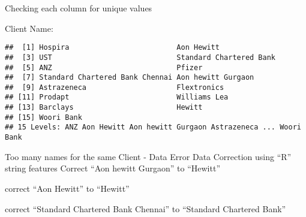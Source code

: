 \documentclass[]{article}
\newenvironment{Shaded}{\begin{snugshade}}{\end{snugshade}}
\newcommand{\KeywordTok}[1]{\textcolor[rgb]{0.13,0.29,0.53}{\textbf{#1}}}
\newcommand{\StringTok}[1]{\textcolor[rgb]{0.31,0.60,0.02}{#1}}
\newcommand{\OperatorTok}[1]{\textcolor[rgb]{0.81,0.36,0.00}{\textbf{#1}}}
\newcommand{\NormalTok}[1]{#1}
\begin{document}
Checking each column for unique values

Client Name:

\begin{Shaded}
\end{Shaded}

\begin{verbatim}
##  [1] Hospira                         Aon Hewitt                     
##  [3] UST                             Standard Chartered Bank        
##  [5] ANZ                             Pfizer                         
##  [7] Standard Chartered Bank Chennai Aon hewitt Gurgaon             
##  [9] Astrazeneca                     Flextronics                    
## [11] Prodapt                         Williams Lea                   
## [13] Barclays                        Hewitt                         
## [15] Woori Bank                     
## 15 Levels: ANZ Aon Hewitt Aon hewitt Gurgaon Astrazeneca ... Woori Bank
\end{verbatim}

Too many names for the same Client - Data Error Data Correction using
``R'' string features Correct ``Aon hewitt Gurgaon'' to ``Hewitt''

\begin{Shaded}
\end{Shaded}

correct ``Aon Hewitt'' to ``Hewitt''

\begin{Shaded}
\end{Shaded}

correct ``Standard Chartered Bank Chennai'' to ``Standard Chartered
Bank''
\end{document}
